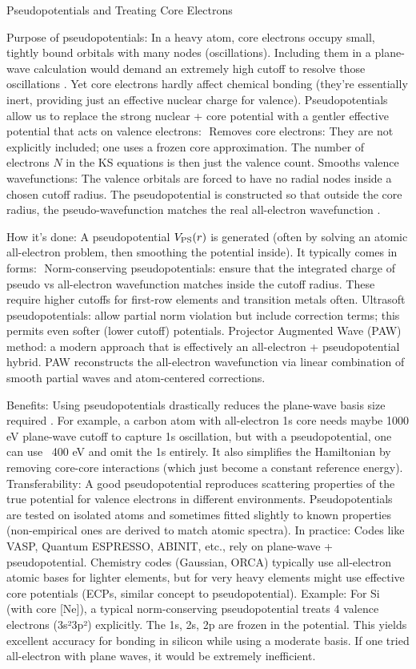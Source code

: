 \begin{frame}{Pseudopotentials and Treating Core Electrons}

Purpose of pseudopotentials: In a heavy atom, core electrons occupy small, tightly bound orbitals with many nodes (oscillations). Including them in a plane-wave calculation would demand an extremely high cutoff to resolve those oscillations  . Yet core electrons hardly affect chemical bonding (they’re essentially inert, providing just an effective nuclear charge for valence). Pseudopotentials allow us to replace the strong nuclear + core potential with a gentler effective potential that acts on valence electrons: 
Removes core electrons: They are not explicitly included; one uses a frozen core approximation. The number of electrons $N$ in the KS equations is then just the valence count.
Smooths valence wavefunctions: The valence orbitals are forced to have no radial nodes inside a chosen cutoff radius. The pseudopotential is constructed so that outside the core radius, the pseudo-wavefunction matches the real all-electron wavefunction .

How it’s done: A pseudopotential $V_{\rm PS}(r)$ is generated (often by solving an atomic all-electron problem, then smoothing the potential inside). It typically comes in forms: 
Norm-conserving pseudopotentials: ensure that the integrated charge of pseudo vs all-electron wavefunction matches inside the cutoff radius. These require higher cutoffs for first-row elements and transition metals often.
Ultrasoft pseudopotentials: allow partial norm violation but include correction terms; this permits even softer (lower cutoff) potentials.
Projector Augmented Wave (PAW) method: a modern approach that is effectively an all-electron + pseudopotential hybrid. PAW reconstructs the all-electron wavefunction via linear combination of smooth partial waves and atom-centered corrections.

Benefits: Using pseudopotentials drastically reduces the plane-wave basis size required . For example, a carbon atom with all-electron 1s core needs maybe 1000 eV plane-wave cutoff to capture 1s oscillation, but with a pseudopotential, one can use ~400 eV and omit the 1s entirely. It also simplifies the Hamiltonian by removing core-core interactions (which just become a constant reference energy).
Transferability: A good pseudopotential reproduces scattering properties of the true potential for valence electrons in different environments. Pseudopotentials are tested on isolated atoms and sometimes fitted slightly to known properties (non-empirical ones are derived to match atomic spectra).
In practice: Codes like VASP, Quantum ESPRESSO, ABINIT, etc., rely on plane-wave + pseudopotential. Chemistry codes (Gaussian, ORCA) typically use all-electron atomic bases for lighter elements, but for very heavy elements might use effective core potentials (ECPs, similar concept to pseudopotential).
Example: For Si (with core [Ne]), a typical norm-conserving pseudopotential treats 4 valence electrons (3s²3p²) explicitly. The 1s, 2s, 2p are frozen in the potential. This yields excellent accuracy for bonding in silicon while using a moderate basis. If one tried all-electron with plane waves, it would be extremely inefficient. \end{frame}


